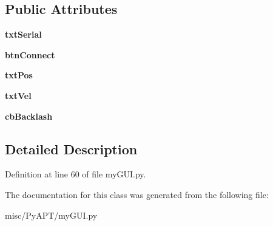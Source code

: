 \subsection*{Public Attributes}
\begin{DoxyCompactItemize}
\item 
{\bfseries txt\+Serial}\hypertarget{classmy_g_u_i_1_1widget_a_p_t_a9e578965b3bead9176238ef710e464b5}{}\label{classmy_g_u_i_1_1widget_a_p_t_a9e578965b3bead9176238ef710e464b5}

\item 
{\bfseries btn\+Connect}\hypertarget{classmy_g_u_i_1_1widget_a_p_t_af6eed98d76ee1774a10b185bb1404f50}{}\label{classmy_g_u_i_1_1widget_a_p_t_af6eed98d76ee1774a10b185bb1404f50}

\item 
{\bfseries txt\+Pos}\hypertarget{classmy_g_u_i_1_1widget_a_p_t_a5fa6b52d9b2620921173a65fb4170b06}{}\label{classmy_g_u_i_1_1widget_a_p_t_a5fa6b52d9b2620921173a65fb4170b06}

\item 
{\bfseries txt\+Vel}\hypertarget{classmy_g_u_i_1_1widget_a_p_t_a5c0c8117fdae21d31ff987f5087f29cb}{}\label{classmy_g_u_i_1_1widget_a_p_t_a5c0c8117fdae21d31ff987f5087f29cb}

\item 
{\bfseries cb\+Backlash}\hypertarget{classmy_g_u_i_1_1widget_a_p_t_a634a2ac00e937117bce441f4cb908cf5}{}\label{classmy_g_u_i_1_1widget_a_p_t_a634a2ac00e937117bce441f4cb908cf5}

\end{DoxyCompactItemize}


\subsection{Detailed Description}


Definition at line 60 of file my\+G\+U\+I.\+py.



The documentation for this class was generated from the following file\+:\begin{DoxyCompactItemize}
\item 
misc/\+Py\+A\+P\+T/my\+G\+U\+I.\+py\end{DoxyCompactItemize}
